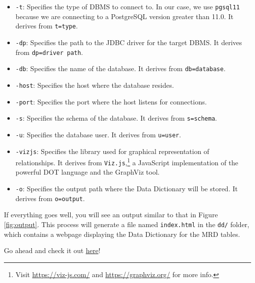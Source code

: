 \documentclass{article}
\begin{document}
\begin{enumerate}
    \begin{itemize}
        \item \texttt{-t}: Specifies the type of DBMS to connect to. In our case, we use \texttt{pgsql11} because we are connecting to a PostgreSQL version greater than 11.0. It derives from \texttt{t=type}.
        \item \texttt{-dp}: Specifies the path to the JDBC driver for the target DBMS. It derives from \texttt{dp=driver path}.
        \item \texttt{-db}: Specifies the name of the database. It derives from \texttt{db=database}.
        \item \texttt{-host}: Specifies the host where the database resides.
        \item \texttt{-port}: Specifies the port where the host listens for connections.
        \item \texttt{-s}: Specifies the schema of the database. It derives from \texttt{s=schema}.
        \item \texttt{-u}: Specifies the database user. It derives from \texttt{u=user}.
        \item \texttt{-vizjs}: Specifies the library used for graphical representation of relationships. It derives from \texttt{Viz.js},\footnote{Visit \url{https://viz-js.com/} and \url{https://graphviz.org/} for more info.} a JavaScript implementation of the powerful DOT language and the GraphViz tool.
        \item \texttt{-o}: Specifies the output path where the Data Dictionary will be stored. It derives from \texttt{o=output}.
    \end{itemize}

    If everything goes well, you will see an output similar to that in Figure \ref{fig:output}. This process will generate a file named \texttt{index.html} in the \texttt{dd/} folder, which contains a webpage displaying the Data Dictionary for the MRD tables.

    Go ahead and check it out \href{https://drive.google.com/file/d/1G1jscTorZTIrQgMYdCXcrxWZU75dsNVt/view?usp=sharing}{here}!


\end{enumerate}
\end{document}
